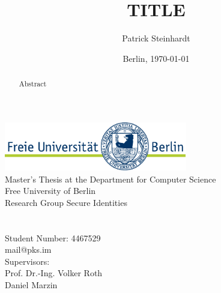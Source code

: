\documentclass[12pt,a4paper,english]{article}
\title{TITLE}
\author{Patrick Steinhardt}
\date{Berlin, \today}
\begin{document}
    \begin{titlepage}
        \makeatletter
        \begin{center}
            \includegraphics[width=0.6\textwidth]{resources/fu-logo.pdf}\\
            {\normalsize Master's Thesis at the Department for Computer Science\\Free University of Berlin\\Research Group Secure Identities}\\[8ex]
            {\Large \@title}\\[6ex]
            {\large \@author}\\
            {\normalsize Student Number: 4467529}\\
            {\normalsize mail@pks.im}\\[4ex]
            {\normalsize Supervisors:\\Prof. Dr.-Ing. Volker Roth\\Daniel Marzin}\\[4ex]
            {\normalsize \@date}
        \end{center}
        \makeatother

        \vfill{}
        \begin{abstract}

            Abstract

        \end{abstract}
        \vfill{}
    \end{titlepage}

    
    
    \clearpage

    \tableofcontents
    \clearpage
    \listoffigures
    \clearpage
    \lstlistoflistings
    \clearpage

    \pagestyle{fancy}
    \setcounter{page}{1}

    
    
    
    
    
    

    \clearpage
    \nocite{*}
    
\end{document}
